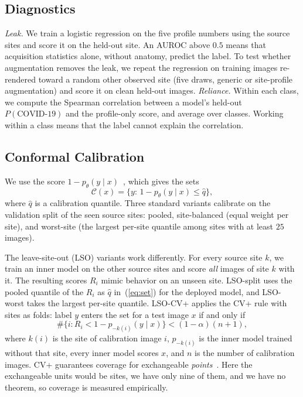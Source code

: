 \documentclass[journal]{IEEEtran}
\begin{document}
\subsection{Diagnostics}\label{sec:diagmethods}
\emph{Leak.} We train a logistic regression on the five profile numbers using the source sites and score it on the held-out site. An AUROC above $0.5$ means that acquisition statistics alone, without anatomy, predict the label. To test whether augmentation removes the leak, we repeat the regression on training images re-rendered toward a random other observed site (five draws, generic or site-profile augmentation) and score it on clean held-out images. \emph{Reliance.} Within each class, we compute the Spearman correlation between a model's held-out $P(\text{COVID-19})$ and the profile-only score, and average over classes. Working within a class means that the label cannot explain the correlation.

\subsection{Conformal Calibration}\label{sec:calib}
We use the score $1-p_\theta(y\mid x)$~\cite{sadinle2019least}, which gives the sets
\begin{equation}\label{eq:set}
\mathcal{C}(x)=\{y:\,1-p_\theta(y\mid x)\le\hat q\},
\end{equation}
where $\hat q$ is a calibration quantile. Three standard variants calibrate on the validation split of the seen source sites: pooled, site-balanced (equal weight per site), and worst-site (the largest per-site quantile among sites with at least $25$ images).

The leave-site-out (LSO) variants work differently. For every source site $k$, we train an inner model on the other source sites and score \emph{all} images of site $k$ with it. The resulting scores $R_i$ mimic behavior on an unseen site. LSO-split uses the pooled quantile of the $R_i$ as $\hat q$ in~(\ref{eq:set}) for the deployed model, and LSO-worst takes the largest per-site quantile. LSO-CV+ applies the CV+ rule with sites as folds: label $y$ enters the set for a test image $x$ if and only if
\begin{equation}\label{eq:cvplus}
\#\{i: R_i<1-p_{-k(i)}(y\mid x)\}<(1-\alpha)(n+1),
\end{equation}
where $k(i)$ is the site of calibration image $i$, $p_{-k(i)}$ is the inner model trained without that site, every inner model scores $x$, and $n$ is the number of calibration images. CV+ guarantees coverage for exchangeable \emph{points}~\cite{barber2021predictive}. Here the exchangeable units would be sites, we have only nine of them, and we have no theorem, so coverage is measured empirically.
\end{document}
